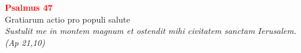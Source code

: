


\def\greinitialformat#1{%
{\fontsize{39}{39}\selectfont #1}%
}




\vspace{0.3cm}
\begin{center}
 \textcolor{red}{\large \bf Psalmus 47}\\
Gratiarum actio pro populi salute\\
\textit{\small Sustulit me in montem magnum et ostendit mihi civitatem sanctam Ierusalem. (Ap 21,10)}
\end{center}
